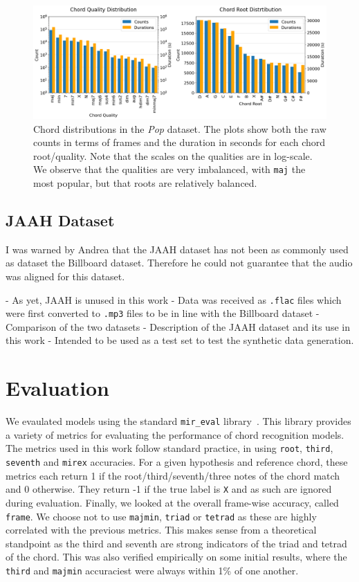 \begin{figure}[h]
    \centering
    \includegraphics[width=1.0\textwidth]{figures/chord_distribution.png}
    \caption{Chord distributions in the \emph{Pop} dataset. The plots show both the raw counts in terms of frames and the duration in seconds for each chord root/quality. Note that the scales on the qualities are in log-scale. We observe that the qualities are very imbalanced, with \texttt{maj} the most popular, but that roots are relatively balanced.}\label{fig:chord-distribution}
\end{figure}


\subsection{JAAH Dataset}
I was warned by Andrea that the JAAH dataset has not been as commonly used as dataset the Billboard dataset. Therefore he could not guarantee that the audio was aligned for this dataset.

- As yet, JAAH is unused in this work
- Data was received as \texttt{.flac} files which were first converted to \texttt{.mp3} files to be in line with the Billboard dataset
- Comparison of the two datasets
- Description of the JAAH dataset and its use in this work
- Intended to be used as a test set to test the synthetic data generation.

\section{Evaluation}

We evaulated models using the standard \texttt{mir\_eval} library~\citep{mir_eval}. This library provides a variety of metrics for evaluating the performance of chord recognition models. The metrics used in this work follow standard practice, in using \texttt{root}, \texttt{third}, \texttt{seventh} and \texttt{mirex} accuracies. For a given hypothesis and reference chord, these metrics each return 1 if the root/third/seventh/three notes of the chord match and 0 otherwise. They return -1 if the true label is \texttt{X} and as such are ignored during evaluation. Finally, we looked at the overall frame-wise accuracy, called \texttt{frame}. We choose not to use \texttt{majmin}, \texttt{triad} or \texttt{tetrad} as these are highly correlated with the previous metrics. This makes sense from a theoretical standpoint as the third and seventh are strong indicators of the triad and tetrad of the chord. This was also verified empirically on some initial results, where the \texttt{third} and \texttt{majmin} accuraciest were always within 1\% of one another.

